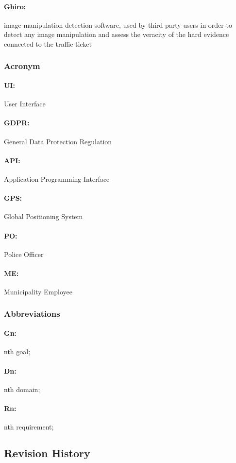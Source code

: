 \documentclass{article}
\begin{document}
\paragraph{Ghiro:} image manipulation detection software, used by third party
users in order to detect any image manipulation and assess the veracity of the
hard evidence connected to the traffic ticket
\subsubsection{Acronym}
\paragraph{UI:} User Interface \paragraph{GDPR:} General Data Protection
Regulation \paragraph{API:} Application Programming Interface \paragraph{GPS:}
Global Positioning System \paragraph{PO:} Police Officer \paragraph{ME:}
Municipality Employee
\subsubsection{Abbreviations}
\paragraph{Gn:} nth goal; \paragraph{Dn:} nth domain; \paragraph{Rn:} nth
requirement;
\subsection{Revision History}
\end{document}
